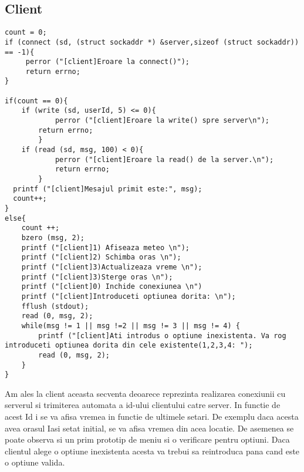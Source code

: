 \documentclass{llncs}
\begin{document}
\subsection{Client}
%
\begin{lstlisting}
count = 0;
if (connect (sd, (struct sockaddr *) &server,sizeof (struct sockaddr)) == -1){
	 perror ("[client]Eroare la connect()");
	 return errno;
}

if(count == 0){
	if (write (sd, userId, 5) <= 0){
     		perror ("[client]Eroare la write() spre server\n");
		return errno;
    	}
	if (read (sd, msg, 100) < 0){
      		perror ("[client]Eroare la read() de la server.\n");
      		return errno;
    	}
  printf ("[client]Mesajul primit este:", msg);
  count++;
}
else{
	count ++;
	bzero (msg, 2);
	printf ("[client]1) Afiseaza meteo \n");
	printf ("[client]2) Schimba oras \n");
	printf ("[client]3)Actualizeaza vreme \n");
	printf ("[client]3)Sterge oras \n");
	printf ("[client]0) Inchide conexiunea \n")
	printf ("[client]Introduceti optiunea dorita: \n");
	fflush (stdout);
	read (0, msg, 2);
	while(msg != 1 || msg !=2 || msg != 3 || msg != 4) {
		printf ("[client]Ati introdus o optiune inexistenta. Va rog introduceti optiunea dorita din cele existente(1,2,3,4: ");
		read (0, msg, 2);
	}
}
\end{lstlisting}
%
Am ales la client aceasta secventa deoarece reprezinta realizarea conexiunii cu serverul si trimiterea automata a id-ului clientului catre server.
In functie de acest Id i se va afisa vremea in functie de ultimele setari. De exemplu daca acesta avea orasul Iasi setat initial,
se va afisa vremea din acea locatie. De asemenea se poate observa si un prim prototip de meniu si o verificare
pentru optiuni. Daca clientul alege o optiune inexistenta acesta va trebui sa reintroduca pana cand este o optiune valida.
%
\end{document}
